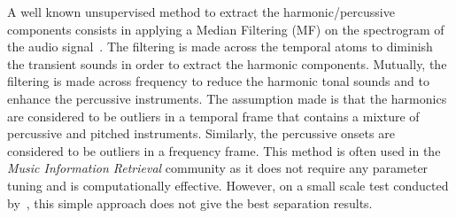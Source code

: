 
A well known unsupervised method to extract the harmonic/percussive components consists in applying a Median Filtering (MF) on the spectrogram of the audio signal~\cite{fitzgerald2010harmonic}. The filtering is made across the temporal atoms to diminish the transient sounds in order to extract the harmonic components. Mutually, the filtering is made across frequency to reduce the harmonic tonal sounds and to enhance the percussive instruments. The assumption made is that the harmonics are considered to be outliers in a temporal frame that contains a mixture of percussive and pitched instruments. Similarly, the percussive onsets are considered to be outliers in a frequency frame. This method is often used in the \emph{Music Information Retrieval} community as it does not require any parameter tuning and is computationally effective. However, on a small scale test conducted by~\cite{canadas2014percussive}, this simple approach does not give the best separation results.%

